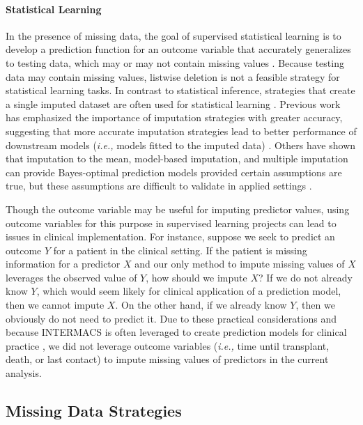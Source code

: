 \documentclass{article}
\begin{document}
\paragraph{Statistical Learning}

In the presence of missing data, the goal of supervised statistical
learning is to develop a prediction function for an outcome variable
that accurately generalizes to testing data, which may or may not
contain missing values \cite{hastie2009elements}. Because testing data
may contain missing values, listwise deletion is not a feasible strategy
for statistical learning tasks. In contrast to statistical inference,
strategies that create a single imputed dataset are often used for
statistical learning \cite{kuhn2019feature}. Previous work has
emphasized the importance of imputation strategies with greater
accuracy, suggesting that more accurate imputation strategies lead to
better performance of downstream models (\textit{i.e., }models fitted to
the imputed data) \cite{jerez2010missing}. Others have shown that
imputation to the mean, model-based imputation, and multiple imputation
can provide Bayes-optimal prediction models provided certain assumptions
are true, but these assumptions are difficult to validate in applied
settings \cite{josse2019consistency}.

Though the outcome variable may be useful for imputing predictor values,
using outcome variables for this purpose in supervised learning projects
can lead to issues in clinical implementation. For instance, suppose we
seek to predict an outcome \(Y\) for a patient in the clinical setting.
If the patient is missing information for a predictor \(X\) and our only
method to impute missing values of \(X\) leverages the observed value of
\(Y\), how should we impute \(X\)? If we do not already know \(Y\),
which would seem likely for clinical application of a prediction model,
then we cannot impute \(X\). On the other hand, if we already know
\(Y\), then we obviously do not need to predict it. Due to these
practical considerations and because INTERMACS is often leveraged to
create prediction models for clinical practice \cite{thomas2014pre}, we
did not leverage outcome variables (\textit{i.e., }time until
transplant, death, or last contact) to impute missing values of
predictors in the current analysis.

\hypertarget{missing-data-strategies}{%
\subsection{Missing Data Strategies}\label{missing-data-strategies}}
\end{document}
